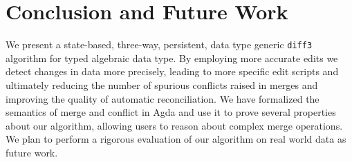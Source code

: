 \documentclass{sigplanconf}
\theoremstyle{plain}
\begin{document}

\section{Conclusion and Future Work}
\label{sec:conclusion}
We present a state-based, three-way, persistent, data type generic
\texttt{diff3} algorithm for typed algebraic data type.
%
By employing more accurate edits we detect changes in data more
precisely, leading to more specific edit scripts and ultimately
reducing the number of spurious conflicts raised in merges and
improving the quality of automatic reconciliation.
%
We have formalized the semantics of merge and conflict in Agda and use
it to prove several properties about our algorithm, allowing users to
reason about complex merge operations.
%
%
We plan to perform a rigorous evaluation of our algorithm on real
world data as future work.
%













\end{document}
